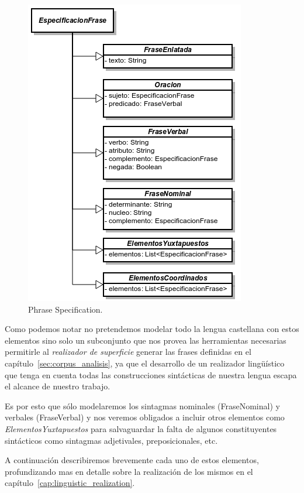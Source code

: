 \begin{figure}[H]
  	\centering
	\includegraphics[scale=0.7]{img/phrase_spec.png}
	\caption{Phrase Specification.}
  	\label{fig:phase_spec}
\end{figure}

Como podemos notar no pretendemos modelar todo la lengua castellana con estos elementos sino solo un subconjunto que nos provea las herramientas necesarias permitirle al \emph{realizador de superficie} generar las frases definidas en el capítulo~\ref{sec:corpus_analisis}, ya que el desarrollo de un realizador lingüístico que tenga en cuenta todas las construcciones sintácticas de nuestra lengua escapa el alcance de nuestro trabajo. 

Es por esto que sólo modelaremos los sintagmas nominales (FraseNominal) y verbales (FraseVerbal) y nos veremos obligados a incluir otros elementos como \emph{ElementosYuxtapuestos} para salvaguardar la falta de algunos constituyentes sintácticos como sintagmas adjetivales, preposicionales, etc. 

A continuación describiremos brevemente cada uno de estos elementos, profundizando mas en detalle sobre la realización de los mismos en el capítulo~\ref{cap:linguistic_realization}.


